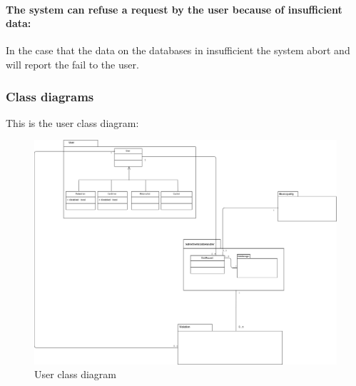 \documentclass[titlepage]{article}
\begin{document}
\paragraph{The system can refuse a request by the user because of 
	insufficient data:}
	In the case that the data on the databases in insufficient the system abort and will report the fail to the 
	user.
\newpage
\subsubsection{Class diagrams}
This is the user class diagram:
\begin{figure}[h
]
	\includegraphics[scale=0.332]{UML users v1.0.png}
	\centering
	\caption{User class diagram}
\end{figure}
\FloatBarrier
\end{document}
